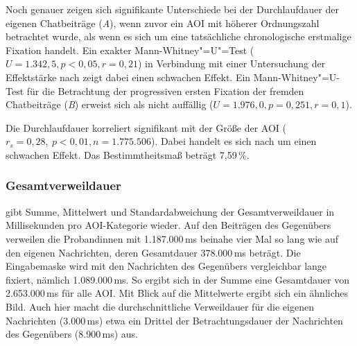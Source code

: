 Noch genauer zeigen sich signifikante Unterschiede bei der Durchlaufdauer der eigenen Chatbeiträge (\emph{A}), wenn zuvor ein AOI mit höherer Ordnungszahl betrachtet wurde, als wenn es sich um eine tatsächliche chronologische erstmalige Fixation handelt. Ein exakter Mann-Whitney"=U"=Test ($U = 1.342,5, p < 0,05,\allowbreak r = 0,21$) in Verbindung mit einer Untersuchung der Effektstärke nach \citet{cohen_power_1992} zeigt dabei einen schwachen Effekt. Ein Mann-Whitney"=U-Test für die Betrachtung der progressiven ersten Fixation der fremden Chatbeiträge (\emph{B}) erweist sich als nicht auffällig ($U = 1.976,0, p = 0,251, r = 0,1$).

Die Durchlaufdauer korreliert signifikant mit der Größe der AOI ($r_{s} = 0,28,\allowbreak\ p < 0,01, n = 1.775.506$). Dabei handelt es sich nach \citet{cohen_power_1992} um einen schwachen Effekt. Das Bestimmtheitsmaß beträgt 7,59\,\%.



\subsubsection{Gesamtverweildauer}
\label{K6:subsubsec:dwelltime:DD}


 gibt Summe, Mittelwert und Standardabweichung der Gesamtverweildauer in Millisekunden pro AOI-Kategorie wieder. Auf den Beiträgen des Gegenübers verweilen die Proband{\textperiodcentered}innen mit 1.187.000\,ms beinahe vier Mal so lang wie auf den eigenen Nachrichten, deren Gesamtdauer 378.000\,ms beträgt. Die Eingabemaske wird mit den Nachrichten des Gegenübers vergleichbar lange fixiert, nämlich 1.089.000\,ms. So ergibt sich in der Summe eine Gesamtdauer von 2.653.000\,ms für alle AOI. Mit Blick auf die Mittelwerte ergibt sich ein ähnliches Bild. Auch hier macht die durchschnittliche Verweildauer für die eigenen Nachrichten (3.000\,ms) etwa ein Drittel der Betrachtungsdauer der Nachrichten des Gegenübers (8.900\,ms) aus.\largerpage


